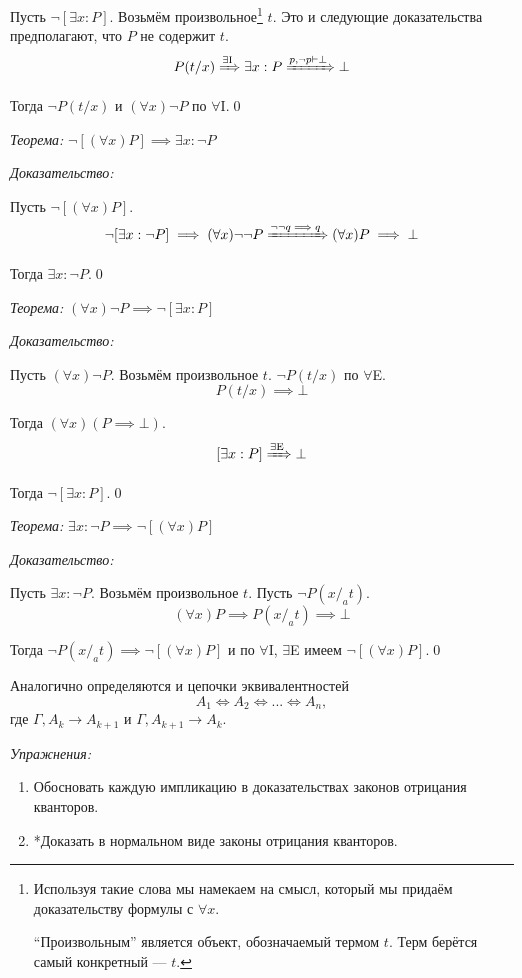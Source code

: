 Пусть ${\lnot[\exists x:P]}$.
Возьмём произвольное\footnote{
	Используя такие слова мы намекаем на смысл, который мы придаём доказательству
	формулы с $\forall x$.

	``Произвольным'' является объект, обозначаемый термом $t$.
	Терм берётся самый конкретный --- $t$.
} $t$. Это и следующие доказательства
предполагают, что $P$ не содержит $t$.
\[
	P(t/x)\xRightarrow{\text{$\exists$I}} \exists x:P
	\xRightarrow{p,\lnot p\vdash\bot} \bot
\]

Тогда $\lnot P(t/x)$ и $(\forall x)\lnot P$
по $\forall$I.\qed

\vspace{1em}
{\it Теорема:} $\lnot[(\forall x)P]\implies \exists x:\lnot P$

{\it Доказательство:}

Пусть $\lnot[(\forall x)P]$.
\[
	\lnot[\exists x:\lnot P]\implies (\forall x)\lnot\lnot P
	\xRightarrow{\lnot\lnot q\implies q} (\forall x)P\implies\bot
\]

Тогда $\exists x:\lnot P$.\qed

\vspace{1em}
{\it Теорема:} $(\forall x)\lnot P\implies \lnot[\exists x:P]$

{\it Доказательство:}

Пусть $(\forall x)\lnot P$. Возьмём произвольное $t$. $\lnot P(t/x)$ по $\forall$E.
\[
	P(t/x)\implies \bot
\]

Тогда $(\forall x)(P\implies \bot)$.
\[
	[\exists x:P]\xRightarrow{\text{$\exists$E}} \bot
\]

Тогда $\lnot[\exists x:P]$.\qed

\vspace{1em}
{\it Теорема:} $\exists x:\lnot P\implies\lnot[(\forall x)P]$

{\it Доказательство:}

Пусть $\exists x:\lnot P$. Возьмём произвольное $t$. Пусть $\lnot P(x/_{a}t)$.
\[
	(\forall x)P\implies P(x/_{a}t)\implies \bot
\]

Тогда ${\lnot P(x/_{a}t)\implies \lnot[(\forall x)P]}$ и по $\forall$I, $\exists$E
имеем $\lnot[(\forall x)P]$.\qed

\vspace{1em}
Аналогично определяются и цепочки эквивалентностей
\[
	A_1\iff A_2\iff ...\iff A_{n},
\]
где $\Gamma,A_{k}\to A_{k+1}$ и $\Gamma,A_{k+1}\to A_{k}$.

\vspace{1em}
{\it Упражнения:}
\begin{enumerate}
	\item{}Обосновать каждую импликацию в доказательствах законов отрицания кванторов.
	\item{}*Доказать в нормальном виде законы отрицания кванторов.
\end{enumerate}


